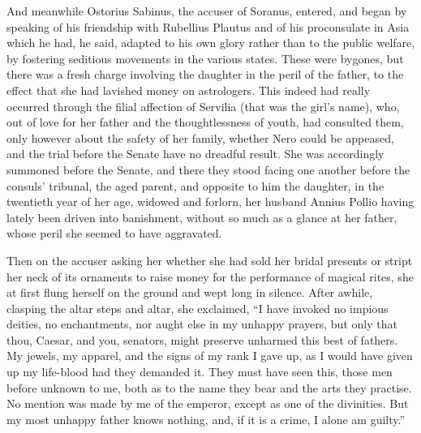 
And meanwhile Ostorius Sabinus, the accuser of Soranus, entered, and began by speaking of his friendship with Rubellius Plautus and of his proconsulate in Asia which he had, he said, adapted to his own glory rather than to the public welfare, by fostering seditious movements in the various states. These were bygones, but there was a fresh charge involving the daughter in the peril of the father, to the effect that she had lavished money on astrologers. This indeed had really occurred through the filial affection of Servilia (that was the girl's name), who, out of love for her father and the thoughtlessness of youth, had consulted them, only however about the safety of her family, whether Nero could be appeased, and the trial before the Senate have no dreadful result. She was accordingly summoned before the Senate, and there they stood facing one another before the consuls' tribunal, the aged parent, and opposite to him the daughter, in the twentieth year of her age, widowed and forlorn, her husband Annius Pollio having lately been driven into banishment, without so much as a glance at her father, whose peril she seemed to have aggravated.


Then on the accuser asking her whether she had sold her bridal presents or stript her neck of its ornaments to raise money for the performance of magical rites, she at first flung herself on the ground and wept long in silence. After awhile, clasping the altar steps and altar, she exclaimed, ``I have invoked no impious deities, no enchantments, nor aught else in my unhappy prayers, but only that thou, Caesar, and you, senators, might preserve unharmed this best of fathers. My jewels, my apparel, and the signs of my rank I gave up, as I would have given up my life-blood had they demanded it. They must have seen this, those men before unknown to me, both as to the name they bear and the arts they practise. No mention was made by me of the emperor, except as one of the divinities. But my most unhappy father knows nothing, and, if it is a crime, I alone am guilty.''



